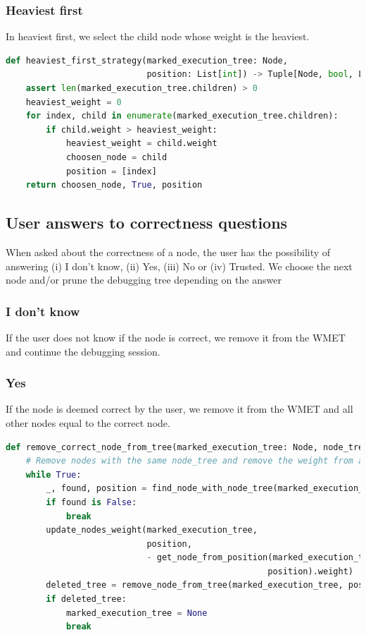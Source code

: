\subsubsection{Heaviest first}
In heaviest first, we select the child node whose weight is the heaviest.
\begin{lstlisting}[language=Python, caption=Heaviest first strategy implementation]
def heaviest_first_strategy(marked_execution_tree: Node,
                            position: List[int]) -> Tuple[Node, bool, List[int]]:
    assert len(marked_execution_tree.children) > 0
    heaviest_weight = 0
    for index, child in enumerate(marked_execution_tree.children):
        if child.weight > heaviest_weight:
            heaviest_weight = child.weight
            choosen_node = child
            position = [index]
    return choosen_node, True, position
\end{lstlisting}
\subsection{User answers to correctness questions}
\label{implementation:correctnessAnswers}
When asked about the correctness of a node, the user has the possibility of answering (i) I don't know, (ii) Yes, (iii) No or (iv) Trusted.
We choose the next node and/or prune the debugging tree depending on the answer
\subsubsection{I don't know}
If the user does not know if the node is correct, we remove it from the WMET and continue the debugging session. 
\subsubsection{Yes}
If the node is deemed correct by the user, we remove it from the WMET and all other nodes equal to the correct node.
\begin{lstlisting}[language=Python, caption=Correct node action]
def remove_correct_node_from_tree(marked_execution_tree: Node, node_tree: Node):
    # Remove nodes with the same node_tree and remove the weight from all its parents
    while True:
        _, found, position = find_node_with_node_tree(marked_execution_tree, [], node_tree)
        if found is False:
            break               
        update_nodes_weight(marked_execution_tree,
                            position,
                            - get_node_from_position(marked_execution_tree,
                                                    position).weight)
        deleted_tree = remove_node_from_tree(marked_execution_tree, position)
        if deleted_tree:
            marked_execution_tree = None
            break
\end{lstlisting}
